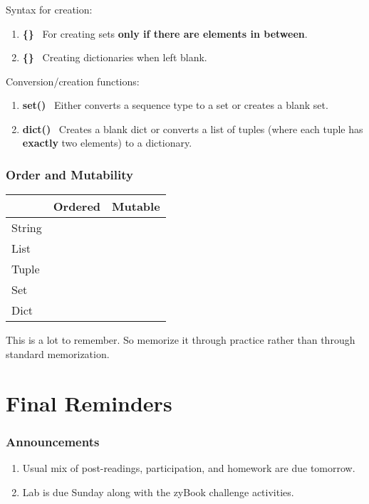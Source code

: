 \documentclass[xcolor=table]{beamer}
\begin{document}
%
%
\begin{frame}[fragile]
  \frametitle{}
  Syntax for creation:
  \begin{enumerate}
    \item \textbf{\{\}} \textrightarrow \ For creating sets \textbf{only if there are elements in between}.
    \item \textbf{\{\}} \textrightarrow \ Creating dictionaries when left blank.
  \end{enumerate}
  \vfill
  Conversion/creation functions:
  \begin{enumerate}
    \item \textbf{set()} \textrightarrow \ Either converts a sequence type to a set or creates a blank set.
    \item \textbf{dict()} \ Creates a blank dict or converts a list of tuples (where each tuple has \textbf{exactly} two elements) to a dictionary.
  \end{enumerate}
\end{frame}


%
%
\begin{frame}[fragile]
  \frametitle{Order and Mutability}
  \begin{table}[]
    \begin{tabular}{l|l|l}
      \hline
      \multicolumn{1}{c|}{}       & \multicolumn{1}{c|}{Ordered}                  & \multicolumn{1}{c}{Mutable}                  \\ \hline
      \multicolumn{1}{c|}{String} & \multicolumn{1}{c|}{\cellcolor[HTML]{34FF34}} & \multicolumn{1}{c}{\cellcolor[HTML]{FE0000}} \\ \hline
      List                        & \cellcolor[HTML]{34FF34}                      & \cellcolor[HTML]{34FF34}                     \\ \hline
      Tuple                       & \cellcolor[HTML]{34FF34}                      & \cellcolor[HTML]{FE0000}                     \\ \hline
      Set                         & \cellcolor[HTML]{FE0000}                      & \cellcolor[HTML]{34FF34}                     \\ \hline
      Dict                        & \cellcolor[HTML]{FE0000}                      & \cellcolor[HTML]{34FF34}                     \\ \hline
    \end{tabular}
  \end{table}
  \pause
  This is a lot to remember. So memorize it through practice rather than through standard memorization. 
\end{frame}



\section{Final Reminders}

\begin{frame}
  \frametitle{Announcements}
  \begin{enumerate}
    \item Usual mix of post-readings, participation, and homework are due tomorrow.
    \item Lab is due Sunday along with the zyBook challenge activities.
  \end{enumerate}
\end{frame}
\end{document}
